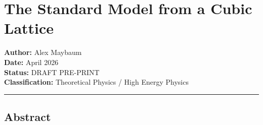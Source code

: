 \documentclass[
]{article}
\author{}
\date{}
\begin{document}
\hypertarget{the-standard-model-from-a-cubic-lattice}{%
\section{The Standard Model from a Cubic
Lattice}\label{the-standard-model-from-a-cubic-lattice}}

\textbf{Author:} Alex Maybaum\\
\textbf{Date:} April 2026\\
\textbf{Status:} DRAFT PRE-PRINT\\
\textbf{Classification:} Theoretical Physics / High Energy Physics

\begin{center}\rule{0.5\linewidth}{0.5pt}\end{center}

\hypertarget{abstract}{%
\subsection{Abstract}\label{abstract}}
\end{document}
